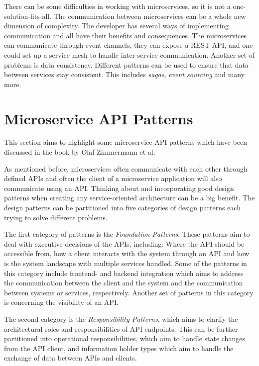 There can be some difficulties in working with microservices, so it is not a one-solution-fits-all.
The communication between microservices can be a whole new dimension of complexity. The developer has several ways of implementing communication
and all have their benefits and consequences. The microservices can communicate through event channels, they can expose a REST API, and one could set up a service mesh to handle inter-service communication.
Another set of problems is data consistency. Different patterns can be used to ensure that data between services stay consistent. This includes \textit{sagas}, \textit{event sourcing} and many more.

\section{Microservice API Patterns}
This section aims to highlight some microservice API patterns which have been discussed in the book by Olaf Zimmermann et al.

As mentioned before, microservices often communicate with each other through defined APIs and often the client of a microservice application will also communicate using an API.
Thinking about and incorporating good design patterns when creating any service-oriented architecture can be a big benefit.
The design patterns can be partitioned into five categories of design patterns each trying to solve different problems.

The first category of patterns is the \textit{Foundation Patterns}. These patterns aim to deal with executive decisions of the APIs, including: Where the API should be
accessible from, how a client interacts with the system through an API and how is the system landscape with multiple services handled. Some of the patterns in this category include frontend- and backend integration which aims
to address the communication between the client and the system and the communication between systems or services, respectively. Another set of patterns in this category is concerning the visibility of an API.

The second category is the \textit{Responsibility Patterns}, which aims to clarify the architectural roles and responsibilities of API endpoints.
This can be further partitioned into operational responsibilities, which aim to handle state changes from the API client, and information holder types which aim to handle the exchange of data between APIs and clients.

